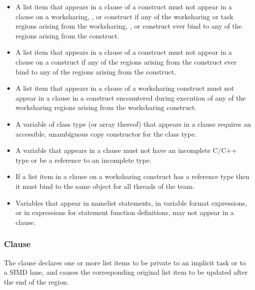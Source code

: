 {{{{\begin{itemize}
\item A list item that appears in a  clause of a  
construct must not appear in a  clause on a worksharing, , 
or  construct if any of the worksharing or task regions arising from 
the worksharing, , or  construct ever bind to any of the 
 regions arising from the  construct.

\item A list item that appears in a  clause of a  construct must not 
appear in a  clause on a  construct if any of the 
 regions arising from the  construct ever bind to any of 
the  regions arising from the  construct. 

\item A list item that appears in a  clause of a worksharing construct must not 
appear in a  clause in a  construct encountered during execution 
of any of the worksharing regions arising from the worksharing construct.

\cppspecificstart
\item A variable of class type (or array thereof) that appears in a  clause 
requires an accessible, unambiguous copy constructor for the class type.
\cppspecificend

\ccppspecificstart
\item A variable that appears in a  clause must not have an incomplete C/C++ type or be a reference to an incomplete type.

\item If a list item in a  clause on a worksharing
construct has a reference type then it must bind to the same object for all threads of the team.
\ccppspecificend

\fortranspecificstart
\item Variables that appear in namelist statements, in variable format expressions, or in 
expressions for statement function definitions, may not appear in a  
clause. 
\fortranspecificend
\end{itemize}










\subsubsection{ Clause}
\label{subsubsec:lastprivate clause}
\summary
The  clause declares one or more list items to be private to an implicit 
task or to a SIMD lane, and causes the corresponding original list item to be updated 
after the end of the region. 

}}}}
